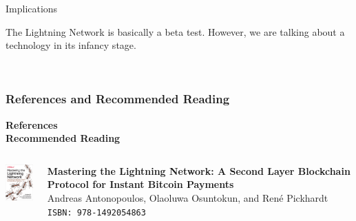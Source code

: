 \documentclass[]{beamer}
\begin{document}
\begin{frame}{Implications}

The Lightning Network is basically a beta test. However, we are talking about a technology in its infancy stage.\\
\vspace{1.5 em}

\\
\vspace{1.5 em}


\end{frame}

\begin{frame}%
\frametitle{References and Recommended Reading}

\textbf{References}\\
	
	

\vspace{2em}
\textbf{Recommended Reading}
	\begin{columns}[T]
		\begin{column}{0.1\textwidth}
				\includegraphics[width = 1.7cm, frame]{../assets/images/antonopoulos_cover_lightning}
		\end{column} %
		\begin{column}{0.8\textwidth}
			\textbf{Mastering the Lightning Network: A Second Layer Blockchain Protocol for Instant Bitcoin Payments} \\ 
			Andreas Antonopoulos, Olaoluwa Osuntokun, and René Pickhardt\\
			\texttt{ISBN: 978-1492054863}
		\end{column}
	\end{columns}

\end{frame}
\end{document}
